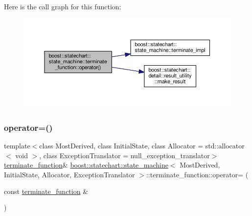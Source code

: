 Here is the call graph for this function\+:
\nopagebreak
\begin{figure}[H]
\begin{center}
\leavevmode
\includegraphics[width=350pt]{classboost_1_1statechart_1_1state__machine_1_1terminate__function_acb8264a868bd58d3495d50ac6b363714_cgraph}
\end{center}
\end{figure}
\mbox{\label{classboost_1_1statechart_1_1state__machine_1_1terminate__function_aa24201446de919d035f3d1a656623c22}} 
\subsubsection{\texorpdfstring{operator=()}{operator=()}}
{\footnotesize\ttfamily template$<$class Most\+Derived, class Initial\+State, class Allocator = std\+::allocator$<$ void $>$, class Exception\+Translator = null\+\_\+exception\+\_\+translator$>$ \\
\mbox{\hyperlink{classboost_1_1statechart_1_1state__machine_1_1terminate__function}{terminate\+\_\+function}}\& \mbox{\hyperlink{classboost_1_1statechart_1_1state__machine}{boost\+::statechart\+::state\+\_\+machine}}$<$ Most\+Derived, Initial\+State, Allocator, Exception\+Translator $>$\+::terminate\+\_\+function\+::operator= (\begin{DoxyParamCaption}\item[{const \mbox{\hyperlink{classboost_1_1statechart_1_1state__machine_1_1terminate__function}{terminate\+\_\+function}} \&}]{ }\end{DoxyParamCaption})\hspace{0.3cm}{\ttfamily [private]}}



